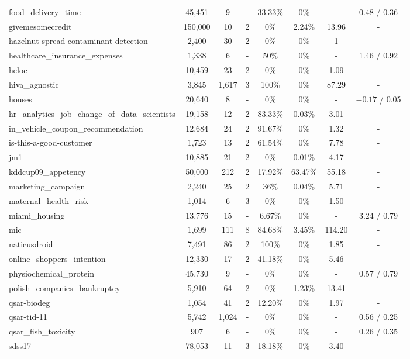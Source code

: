 \begin{table}[ht]
{\begin{tabular}{lccccccc}
food\_delivery\_time & 45,451 & 9 & - & 33.33\% & 0\% & - & 0.48 / 0.36 \\
givemesomecredit & 150,000 & 10 & 2 & 0\% & 2.24\% & 13.96 & - \\
hazelnut-spread-contaminant-detection & 2,400 & 30 & 2 & 0\% & 0\% & 1 & - \\
healthcare\_insurance\_expenses & 1,338 & 6 & - & 50\% & 0\% & - & 1.46 / 0.92 \\
heloc & 10,459 & 23 & 2 & 0\% & 0\% & 1.09 & - \\
hiva\_agnostic & 3,845 & 1,617 & 3 & 100\% & 0\% & 87.29 & - \\
houses & 20,640 & 8 & - & 0\% & 0\% & - & $-0.17$ / 0.05 \\
hr\_analytics\_job\_change\_of\_data\_scientists & 19,158 & 12 & 2 & 83.33\% & 0.03\% & 3.01 & - \\
in\_vehicle\_coupon\_recommendation & 12,684 & 24 & 2 & 91.67\% & 0\% & 1.32 & - \\
is-this-a-good-customer & 1,723 & 13 & 2 & 61.54\% & 0\% & 7.78 & - \\
jm1 & 10,885 & 21 & 2 & 0\% & 0.01\% & 4.17 & - \\
kddcup09\_appetency & 50,000 & 212 & 2 & 17.92\% & 63.47\% & 55.18 & - \\
marketing\_campaign & 2,240 & 25 & 2 & 36\% & 0.04\% & 5.71 & - \\
maternal\_health\_risk & 1,014 & 6 & 3 & 0\% & 0\% & 1.50 & - \\
miami\_housing & 13,776 & 15 & - & 6.67\% & 0\% & - & 3.24 / 0.79 \\
mic & 1,699 & 111 & 8 & 84.68\% & 3.45\% & 114.20 & - \\
naticusdroid & 7,491 & 86 & 2 & 100\% & 0\% & 1.85 & - \\
online\_shoppers\_intention & 12,330 & 17 & 2 & 41.18\% & 0\% & 5.46 & - \\
physiochemical\_protein & 45,730 & 9 & - & 0\% & 0\% & - & 0.57 / 0.79 \\
polish\_companies\_bankruptcy & 5,910 & 64 & 2 & 0\% & 1.23\% & 13.41 & - \\
qsar-biodeg & 1,054 & 41 & 2 & 12.20\% & 0\% & 1.97 & - \\
qsar-tid-11 & 5,742 & 1,024 & - & 0\% & 0\% & - & 0.56 / 0.25 \\
qsar\_fish\_toxicity & 907 & 6 & - & 0\% & 0\% & - & 0.26 / 0.35 \\
sdss17 & 78,053 & 11 & 3 & 18.18\% & 0\% & 3.40 & - \\

\end{tabular}}
\end{table}
